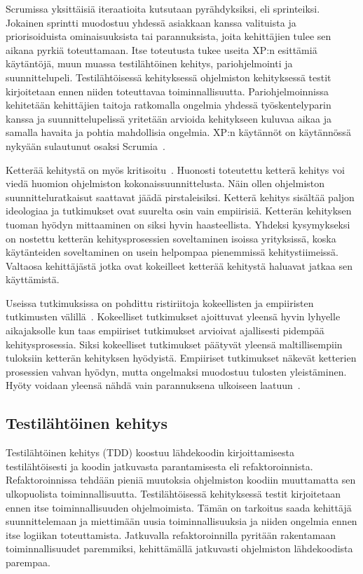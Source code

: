 \documentclass[finnish]{../tktltiki2}
\theoremstyle{definition}
\theoremstyle{remark}
\begin{document}
    Scrumissa yksittäisiä iteraatioita kutsutaan pyrähdyksiksi, eli sprinteiksi. Jokainen sprintti muodostuu yhdessä 
asiakkaan kanssa valituista ja priorisoiduista ominaisuuksista tai parannuksista, joita kehittäjien tulee sen aikana 
pyrkiä toteuttamaan. Itse toteutusta tukee useita XP:n esittämiä käytäntöjä, muun muassa testilähtöinen kehitys, 
pariohjelmointi ja suunnittelupeli. Testilähtöisessä kehityksessä ohjelmiston kehityksessä testit kirjoitetaan ennen 
niiden toteuttavaa toiminnallisuutta. Pariohjelmoinnissa kehitetään kehittäjien taitoja ratkomalla ongelmia yhdessä 
työskentelyparin kanssa ja suunnittelupelissä yritetään arvioida kehitykseen kuluvaa aikaa ja samalla havaita ja pohtia 
mahdollisia ongelmia. XP:n käytännöt on käytännössä nykyään sulautunut osaksi Scrumia~\cite{Kn07}.

    Ketterää kehitystä on myös kritisoitu~\cite{DD08}. Huonosti toteutettu ketterä kehitys voi viedä huomion ohjelmiston 
kokonaissuunnittelusta. Näin ollen ohjelmiston suunnitteluratkaisut saattavat jäädä pirstaleisiksi. Ketterä kehitys 
sisältää paljon ideologiaa ja tutkimukset ovat suurelta osin vain empiirisiä. Ketterän kehityksen tuoman hyödyn 
mittaaminen on siksi hyvin haasteellista. Yhdeksi kysymykseksi on nostettu ketterän kehitysprosessien soveltaminen 
isoissa yrityksissä, koska käytänteiden soveltaminen on usein helpompaa pienemmissä kehitystiimeissä. Valtaosa 
kehittäjästä jotka ovat kokeilleet ketterää kehitystä haluavat jatkaa sen käyttämistä.

    Useissa tutkimuksissa on pohdittu ristiriitoja kokeellisten ja empiiristen tutkimusten välillä~\cite{DD08, SS10}. 
Kokeelliset tutkimukset ajoittuvat yleensä hyvin lyhyelle aikajaksolle kun taas empiiriset tutkimukset arvioivat 
ajallisesti pidempää kehitysprosessia. Siksi kokeelliset tutkimukset päätyvät yleensä maltillisempiin tuloksiin ketterän 
kehityksen hyödyistä. Empiiriset tutkimukset näkevät ketterien prosessien vahvan hyödyn, mutta ongelmaksi muodostuu 
tulosten yleistäminen. Hyöty voidaan yleensä nähdä vain parannuksena ulkoiseen laatuun~\cite{SS10}.

\subsection{Testilähtöinen kehitys}

Testilähtöinen kehitys (TDD) koostuu lähdekoodin kirjoittamisesta testilähtöisesti ja koodin jatkuvasta parantamisesta 
eli refaktoroinnista. Refaktoroinnissa tehdään pieniä muutoksia ohjelmiston koodiin muuttamatta sen ulkopuolista 
toiminnallisuutta. Testilähtöisessä kehityksessä testit kirjoitetaan ennen itse toiminnallisuuden ohjelmoimista. Tämän 
on tarkoitus saada kehittäjä suunnittelemaan ja miettimään uusia toiminnallisuuksia ja niiden ongelmia ennen itse 
logiikan toteuttamista. Jatkuvalla refaktoroinnilla pyritään rakentamaan toiminnallisuudet paremmiksi, kehittämällä 
jatkuvasti ohjelmiston lähdekoodista parempaa.
\end{document}
